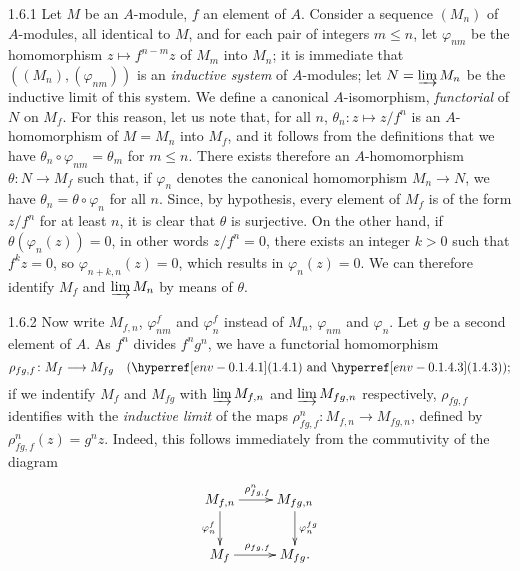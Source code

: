
\begin{env}{1.6.1}
\label{env-0.1.6.1}
Let $M$ be an $A$-module, $f$ an element of $A$. Consider a sequence
$(M_n)$ of $A$-modules, all identical to $M$, and for each pair of integers
$m\leq n$, let $\varphi_{nm}$ be the homomorphism $z\mapsto f^{n-m}z$ of $M_m$
into $M_n$; it is immediate that $((M_n),(\varphi_{nm}))$ is an \emph{inductive system}
of $A$-modules; let $N=\varinjlim M_n$ be the inductive limit of this system. We define
a canonical $A$-isomorphism, \emph{functorial} of $N$ on $M_f$. For this reason, let us
note that, for all $n$, $\theta_n\colon z\mapsto z/f^n$ is an $A$-homomorphism of $M=M_n$ into
$M_f$, and it follows from the definitions that we have $\theta_n\circ\varphi_{nm}=\theta_m$
for $m\leq n$. There exists therefore an $A$-homomorphism $\theta\colon N\to M_f$ such that, if
$\varphi_n$ denotes the canonical homomorphism $M_n\to N$, we have $\theta_n=\theta\circ\varphi_n$
for all $n$. Since, by hypothesis, every element of $M_f$ is of the form $z/f^n$ for at least $n$,
it is clear that $\theta$ is surjective. On the other hand, if $\theta(\varphi_n(z))=0$,
in other words $z/f^n=0$, there exists an integer $k>0$ such that $f^k z=0$, so $\varphi_{n+k,n}(z)=0$,
which results in $\varphi_n(z)=0$. We can therefore identify $M_f$ and $\varinjlim M_n$ by means
of $\theta$.
\end{env}

\begin{env}{1.6.2}
\label{env-0.1.6.2}
Now write $M_{f,n}$, $\varphi_{nm}^f$ and $\varphi_n^f$ instead of $M_n$, $\varphi_{nm}$ and
$\varphi_n$. Let $g$ be a second element of $A$. As $f^n$ divides $f^n g^n$, we have a functorial
homomorphism
\[
  \rho_{fg,f}\colon M_f\longrightarrow M_{fg}\quad(\eref{1.4.1}\text{ and }\eref{1.4.3});
\]
if we indentify $M_f$ and $M_{fg}$ with $\varinjlim M_{f,n}$ and $\varinjlim M_{fg,n}$
respectively, $\rho_{fg,f}$ identifies with the \emph{inductive limit} of the maps
$\rho_{fg,f}^n\colon M_{f,n}\to M_{fg,n}$, defined by $\rho_{fg,f}^n(z)=g^n z$. Indeed, this follows
immediately from the commutivity of the diagram
\[
  \xymatrix{
    M_{f,n}\ar[r]^{\rho_{fg,f}^n}\ar[d]_{\varphi_n^f} & M_{fg,n}\ar[d]^{\varphi_n^{fg}}\\
    M_f\ar[r]^{\rho_{fg,f}} & M_{fg}.
  }
\]
\end{env}

